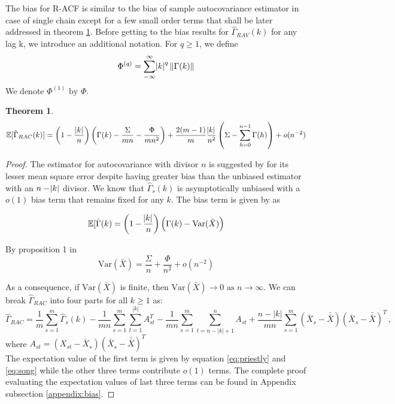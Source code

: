 \documentclass[12pt]{article}
\newcommand{\Var}{\text{Var}}
\newtheorem{theorem}{Theorem}
\theoremstyle{remark}
\begin{document}
The bias for R-ACF is similar to the bias of sample autocovariance estimator in case of single chain except for a few small order terms that shall be later addressed in theorem \ref{th:RAC_expec}. Before getting to the bias results for $\hat{\Gamma}_{RAV}(k)$ for any lag k, we introduce an additional notation. For $q \geq 1$, we define
\[
\Phi^{(q)} = \sum\limits_{-\infty}^{\infty}\abs{k}^q \|\Gamma(k)\|
\]
We denote $\Phi^{(1)} \textrm{ by } \Phi$. 
\begin{theorem} \label{th:RAC_expec}
   \[
   \mathbb{E}[\hat{\Gamma}_{RAC}(k)] = \left(1- \dfrac{|k|}{n}\right)\left(\Gamma(k) - \dfrac{\Sigma}{mn} - \dfrac{\Phi}{mn^2}\right)  + \dfrac{2(m-1)}{m}\dfrac{\abs{k}}{n^2} \left(\Sigma - \sum_{h=0}^{n-1}\Gamma(h)\right) + o(n^{-2})
   \]
\end{theorem}

\begin{proof}
 The estimator for autocovariance with divisor $n$ is suggested by \cite{parzen1961approach} for its lesser mean square error despite having greater bias than the unbiased estimator with an $n - \abs{k}$ divisor. 
 We know that $\hat{\Gamma}_s(k)$ is asymptotically unbiased with a $o(1)$ bias term that remains fixed for any $k$. The bias term is given by \cite{priestley1981spectral} as 
 
 \begin{equation} \label{eq:priestly}
     \mathbb{E}[\hat{\Gamma}(k) = \left(1- \dfrac{\abs{k}}{n}\right)\left(\Gamma(k) - \Var{(\bar{X})}
 \right)
 \end{equation}
 
By proposition 1 in \cite{song1995optimal} 
\begin{equation} \label{eq:song}
\Var(\bar{X}) = \dfrac{\Sigma}{n} + \dfrac{\Phi}{n^2} + o(n^{-2})
\end{equation}

As a consequence, if $\Var(\bar{X})$ is finite, then $\Var(\bar{X}) \to 0 \textrm{ as } n \to \infty$. We can break $\hat{\Gamma}_{RAC}$ into four parts for all $k \geq 1$ as:
 \[
 \hat{\Gamma}_{RAC} =  \dfrac{1}{m}\sum_{s=1}^{m}\hat{\Gamma}_s(k) - \dfrac{1}{mn}\sum_{s=1}^{m}\sum_{t=1}^{|k|}A_{st}^T - \dfrac{1}{mn}\sum_{s=1}^{m}\sum_{t=n-|k|+1}^{n}A_{st} + \dfrac{n-|k|}{mn}\sum_{s=1}^{m}(\bar{X}_s - \bar{\bar{X}})(\bar{X}_s - \bar{\bar{X}})^T\,,
 \]
%
where $A_{st} = (X_{st}-\bar{X}_s)(\bar{X}_s - \bar{\bar{X}})^T$\\
The expectation value of the first term is given by equation \ref{eq:priestly} and \ref{eq:song} while the other three terms contribute $o(1)$ terms. The complete proof evaluating the expectation values of last three terms can be found in Appendix subsection \ref{appendix:bias}.
\end{proof}
\end{document}
